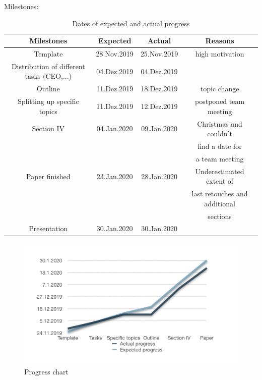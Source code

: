 Milestones:
\begin{table}[H]
\caption{Dates of expected and actual progress}
\centering
\begin{tabular}{cccc}
\toprule
Milestones & Expected & Actual& Reasons\\
\midrule
Template & 28.Nov.2019 & 25.Nov.2019& high motivation\\
Distribution of different tasks (CEO,...) & 04.Dez.2019 &04.Dez.2019&\\
Outline & 11.Dez.2019& 18.Dez.2019& topic change\\
Splitting up specific topics & 11.Dez.2019&12.Dez.2019 &postponed team meeting\\
Section IV & 04.Jan.2020&09.Jan.2020& Christmas and couldn't\\
&&& find a date for \\ &&& a team meeting\\
Paper finished& 23.Jan.2020& 28.Jan.2020& Underestimated extent of\\
&&& last retouches and additional \\
&&&sections\\
Presentation & 30.Jan.2020&30.Jan.2020&\\
\bottomrule
\end{tabular}
\end{table}
\begin{parcolumns}[colwidths={1=2.5 cm, 2=10 cm, 3=2.5cm}]{3}
\colchunk{}
\end{parcolumns}
\begin{figure}[H]
\centering
\includegraphics[scale=1.0]{Progress_chart}
\caption{Progress chart}
\end{figure}